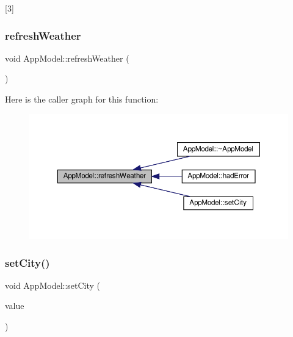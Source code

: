 \mbox{[}3\mbox{]} 

\mbox{\label{class_app_model_a37e1da9d028779f7f0fc908e4c04fa76}} 
\subsubsection{\texorpdfstring{refresh\+Weather}{refreshWeather}}
{\footnotesize\ttfamily void App\+Model\+::refresh\+Weather (\begin{DoxyParamCaption}{ }\end{DoxyParamCaption})\hspace{0.3cm}{\ttfamily [slot]}}

Here is the caller graph for this function\+:\nopagebreak
\begin{figure}[H]
\begin{center}
\leavevmode
\includegraphics[width=350pt]{class_app_model_a37e1da9d028779f7f0fc908e4c04fa76_icgraph}
\end{center}
\end{figure}
\mbox{\label{class_app_model_ad0135d4a1551b6484ac28c434f861af5}} 
\subsubsection{\texorpdfstring{set\+City()}{setCity()}}
{\footnotesize\ttfamily void App\+Model\+::set\+City (\begin{DoxyParamCaption}\item[{const Q\+String \&}]{value }\end{DoxyParamCaption})}

